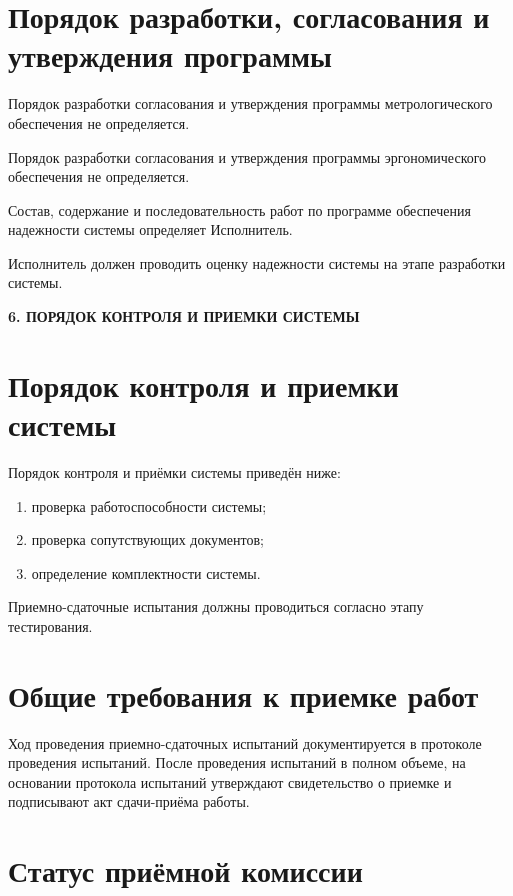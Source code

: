 \section{Порядок разработки, согласования и утверждения программы}

Порядок разработки согласования и утверждения программы
метрологического обеспечения не определяется.

Порядок разработки согласования и утверждения программы
эргономического обеспечения не определяется.

Состав, содержание и последовательность работ по программе
обеспечения надежности системы определяет Исполнитель.

Исполнитель должен проводить оценку надежности системы на этапе
разработки системы.

\newpage
\begin{center}
  \textbf{\large 6. ПОРЯДОК КОНТРОЛЯ И ПРИЕМКИ СИСТЕМЫ}
\end{center}

\section{Порядок контроля и приемки системы}

Порядок контроля и приёмки системы приведён ниже:

\begin{enumerate}
\item проверка работоспособности системы;
\item проверка сопутствующих документов;
\item определение комплектности системы.
\end{enumerate}

Приемно-сдаточные испытания должны проводиться согласно этапу
тестирования.

\section{Общие требования к приемке работ}

Ход проведения приемно-сдаточных испытаний документируется в
протоколе проведения испытаний. После проведения испытаний в полном
объеме, на основании протокола испытаний утверждают свидетельство о
приемке и подписывают акт сдачи-приёма работы.

\section{Статус приёмной комиссии}

